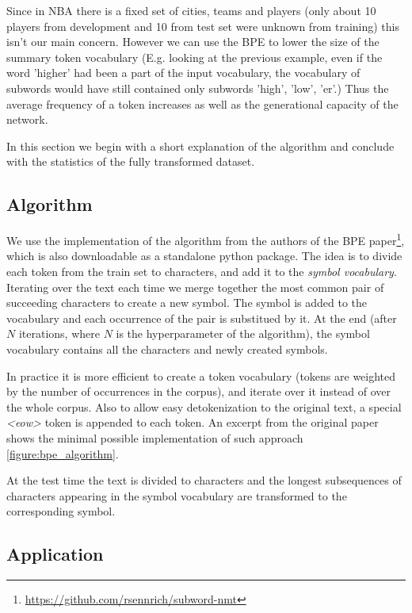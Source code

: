 Since in NBA there is a fixed set of cities, teams and players (only about 10 players from development and 10 from test set were unknown from training) this isn't our main concern. However we can use the BPE to lower the size of the summary token vocabulary (E.g. looking at the previous example, even if the word 'higher' had been a part of the input vocabulary, the vocabulary of subwords would have still contained only subwords 'high', 'low', 'er'.) Thus the average frequency of a token increases as well as the generational capacity of the network.

In this section we begin with a short explanation of the algorithm and conclude with the statistics of the fully transformed dataset.

\subsection{Algorithm}

We use the implementation of the algorithm from the authors of the BPE paper\footnote{\url{https://github.com/rsennrich/subword-nmt}}, which is also downloadable as a standalone python package. The idea is to divide each token from the train set to characters, and add it to the \emph{symbol vocabulary}. Iterating over the text each time we merge together the most common pair of succeeding characters to create a new symbol. The symbol is added to the vocabulary and each occurrence of the pair is substitued by it. At the end (after $N$ iterations, where $N$ is the hyperparameter of the algorithm), the symbol vocabulary contains all the characters and newly created symbols.

In practice it is more efficient to create a token vocabulary (tokens are weigh\-ted by the number of occurrences in the corpus), and iterate over it instead of over the whole corpus. Also to allow easy detokenization to the original text, a special \emph{\textless eow\textgreater} token is appended to each token. An excerpt from the original paper shows the minimal possible implementation of such approach \ref{figure:bpe_algorithm}.

At the test time the text is divided to characters and the longest subsequences of characters appearing in the symbol vocabulary are transformed to the corresponding symbol.

\subsection{Application}


